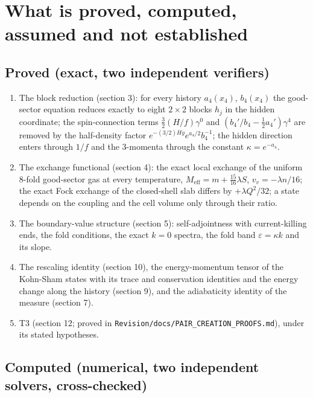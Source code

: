 \documentclass[11pt]{article}
\begin{document}
\section{What is proved, computed, assumed and not established}

\subsection{Proved (exact, two independent verifiers)}

\begin{enumerate}
\item The block reduction (section 3): for every history $a_4(x_4)$, $b_4(x_4)$ the good-sector equation reduces exactly to eight $2 \times 2$ blocks $h_j$ in the hidden coordinate; the spin-connection terms $\tfrac32(H/f)\gamma^0$ and $(b_4'/b_4 - \tfrac12a_4')\gamma^4$ are removed by the half-density factor $e^{-(3/2)Hy}e^{a_4/2}b_4^{-1}$; the hidden direction enters through $1/f$ and the 3-momenta through the constant $\kappa = e^{-a_4}$.
\item The exchange functional (section 4): the exact local exchange of the uniform 8-fold good-sector gas at every temperature, $M_{\mathrm{eff}} = m + \frac{15}{16}\lambda S$, $v_v = -\lambda n/16$; the exact Fock exchange of the closed-shell slab differs by $+\lambda Q^2/32$; a state depends on the coupling and the cell volume only through their ratio.
\item The boundary-value structure (section 5): self-adjointness with current-killing ends, the fold conditions, the exact $k = 0$ spectra, the fold band $\varepsilon = \kappa k$ and its slope.
\item The rescaling identity (section 10), the energy-momentum tensor of the Kohn-Sham states with its trace and conservation identities and the energy change along the history (section 9), and the adiabaticity identity of the measure (section 7).
\item T3 (section 12; proved in \texttt{Revision\allowbreak{}/docs/PA\allowbreak{}IR\_CREAT\allowbreak{}ION\_PROO\allowbreak{}FS.md}), under its stated hypotheses.
\end{enumerate}

\subsection{Computed (numerical, two independent solvers, cross-checked)}
\end{document}
